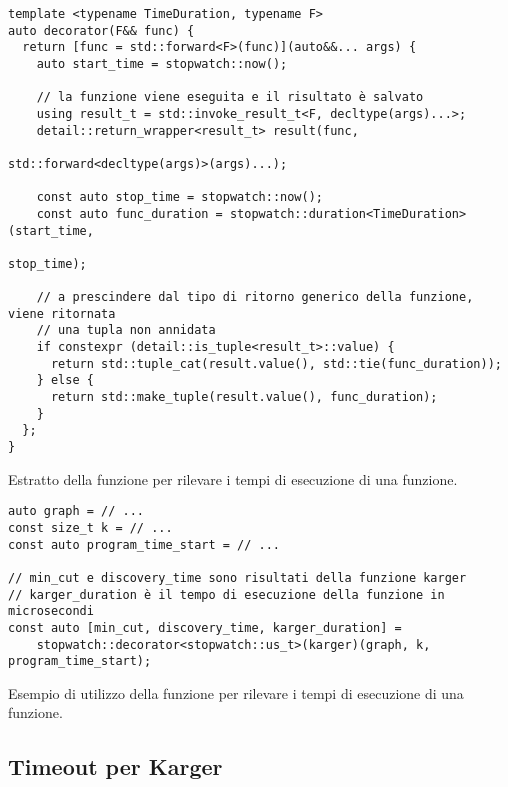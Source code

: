 \begin{listing}[!ht]
\begin{verbatim}
template <typename TimeDuration, typename F>
auto decorator(F&& func) {
  return [func = std::forward<F>(func)](auto&&... args) {
    auto start_time = stopwatch::now();
    
    // la funzione viene eseguita e il risultato è salvato
    using result_t = std::invoke_result_t<F, decltype(args)...>;
    detail::return_wrapper<result_t> result(func,
                                            std::forward<decltype(args)>(args)...);

    const auto stop_time = stopwatch::now();
    const auto func_duration = stopwatch::duration<TimeDuration>(start_time,
                                                                 stop_time);

    // a prescindere dal tipo di ritorno generico della funzione, viene ritornata
    // una tupla non annidata
    if constexpr (detail::is_tuple<result_t>::value) {
      return std::tuple_cat(result.value(), std::tie(func_duration));
    } else {
      return std::make_tuple(result.value(), func_duration);
    }
  };
}
\end{verbatim}
\caption{Estratto della funzione  per rilevare i tempi di esecuzione di una funzione.}
\label{listings:stopwatch-decorator}
\end{listing}


\begin{listing}[!ht]
\begin{verbatim}
auto graph = // ...
const size_t k = // ...
const auto program_time_start = // ...

// min_cut e discovery_time sono risultati della funzione karger
// karger_duration è il tempo di esecuzione della funzione in microsecondi
const auto [min_cut, discovery_time, karger_duration] =
    stopwatch::decorator<stopwatch::us_t>(karger)(graph, k, program_time_start);

\end{verbatim}
\caption{Esempio di utilizzo della funzione  per rilevare i tempi di esecuzione di una funzione.}
\label{listings:stopwatch-decorator-usage}
\end{listing}

\subsection{Timeout per Karger}

